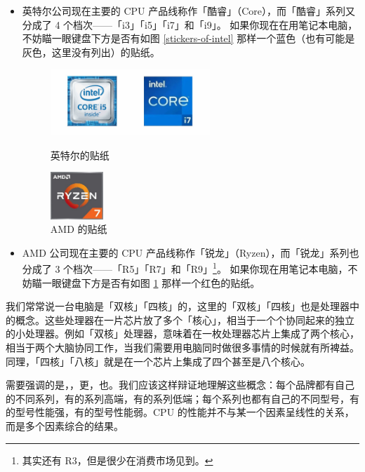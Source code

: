 \begin{itemize}
  \item 英特尔公司现在主要的 CPU 产品线称作「酷睿」（Core），而「酷睿」系列又分成了 4 个档次——「i3」「i5」「i7」和「i9」。
    如果你现在在用笔记本电脑，不妨瞄一眼键盘下方是否有如图 \ref{stickers-of-intel} 那样一个蓝色（也有可能是灰色，这里没有列出）的贴纸。
    \begin{figure}[htb!]
      \centering
      \begin{minipage}{8cm}
        \centering
        \includegraphics[width=6cm]{assets/Stickers_Intel.jpg}
        \caption{英特尔的贴纸}
        \label{stickers-of-intel}
      \end{minipage}
      \qquad
      \begin{minipage}{5cm}
        \centering
        \includegraphics[width=2cm]{assets/Sticker_AMD.jpg}
        \caption{AMD 的贴纸}
        \label{sticker-of-amd}
      \end{minipage}
    \end{figure}
  \item AMD 公司现在主要的 CPU 产品线称作「锐龙」（Ryzen），而「锐龙」系列也分成了 3 个档次——「R5」「R7」和「R9」\footnote{其实还有 R3，但是很少在消费市场见到。}。
    如果你现在用笔记本电脑，不妨瞄一眼键盘下方是否有如图 \ref{sticker-of-amd} 那样一个红色的贴纸。
\end{itemize}

我们常常说一台电脑是「双核」「四核」的，这里的「双核」「四核」也是处理器中的概念。这些处理器在一片芯片放了多个「核心」，相当于一个个协同起来的独立的小处理器。例如「双核」处理器，意味着在一枚处理器芯片上集成了两个核心，相当于两个大脑协同工作，当我们需要用电脑同时做很多事情的时候就有所裨益。同理，「四核」「八核」就是在一个芯片上集成了四个甚至是八个核心。

需要强调的是，，更，也。我们应该这样辩证地理解这些概念：每个品牌都有自己的不同系列，有的系列高端，有的系列低端；每个系列也都有自己的不同型号，有的型号性能强，有的型号性能弱。CPU 的性能并不与某一个因素呈线性的关系，而是多个因素综合的结果。


